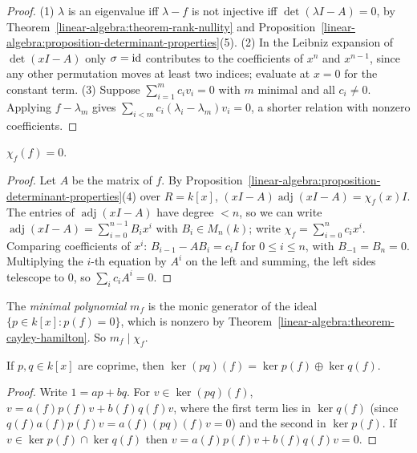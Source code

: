 \begin{proof}
(1) $\lambda$ is an eigenvalue iff $\lambda - f$ is not injective iff $\det(\lambda I - A) = 0$, by
Theorem~\ref{linear-algebra:theorem-rank-nullity} and
Proposition~\ref{linear-algebra:proposition-determinant-properties}(5).
(2) In the Leibniz expansion of $\det(xI - A)$ only $\sigma = \mathrm{id}$ contributes to the coefficients of $x^n$ and
$x^{n-1}$, since any other permutation moves at least two indices; evaluate at $x = 0$ for the constant
term.
(3) Suppose $\sum_{i=1}^m c_i v_i = 0$ with $m$ minimal and all $c_i \neq 0$. Applying $f - \lambda_m$ gives
$\sum_{i<m} c_i(\lambda_i - \lambda_m)v_i = 0$, a shorter relation with nonzero coefficients.
\end{proof}

\begin{theorem}\label{linear-algebra:theorem-cayley-hamilton}
$\chi_f(f) = 0$.
\end{theorem}

\begin{proof}
Let $A$ be the matrix of $f$. By Proposition~\ref{linear-algebra:proposition-determinant-properties}(4)
over $R = k[x]$, $(xI - A)\operatorname{adj}(xI - A) = \chi_f(x)I$. The entries of $\operatorname{adj}(xI - A)$ have degree
$< n$, so we can write $\operatorname{adj}(xI - A) = \sum_{i=0}^{n-1} B_i x^i$ with $B_i \in M_n(k)$; write
$\chi_f = \sum_{i=0}^n c_i x^i$. Comparing coefficients of $x^i$: $B_{i-1} - AB_i = c_i I$ for $0 \leq i \leq n$, with
$B_{-1} = B_n = 0$. Multiplying the $i$-th equation by $A^i$ on the left and summing, the left sides
telescope to $0$, so $\sum_i c_i A^i = 0$.
\end{proof}

\begin{definition}\label{linear-algebra:definition-minimal-polynomial}
The \emph{minimal polynomial} $m_f$ is the monic generator of the ideal
$\{p \in k[x] : p(f) = 0\}$, which is nonzero by Theorem~\ref{linear-algebra:theorem-cayley-hamilton}.
So $m_f \mid \chi_f$.
\end{definition}

\begin{lemma}\label{linear-algebra:lemma-kernel}
If $p, q \in k[x]$ are coprime, then $\ker (pq)(f) = \ker p(f) \oplus \ker q(f)$.
\end{lemma}

\begin{proof}
Write $1 = ap + bq$. For $v \in \ker(pq)(f)$, $v = a(f)p(f)v + b(f)q(f)v$, where the first term lies in
$\ker q(f)$ (since $q(f)a(f)p(f)v = a(f)(pq)(f)v = 0$) and the second in $\ker p(f)$. If
$v \in \ker p(f) \cap \ker q(f)$ then $v = a(f)p(f)v + b(f)q(f)v = 0$.
\end{proof}

